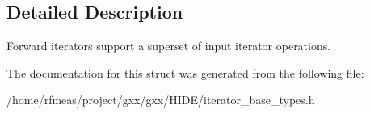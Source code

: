 \subsection{Detailed Description}
Forward iterators support a superset of input iterator operations. 

The documentation for this struct was generated from the following file\+:\begin{DoxyCompactItemize}
\item 
/home/rfmeas/project/gxx/gxx/\+H\+I\+D\+E/iterator\+\_\+base\+\_\+types.\+h\end{DoxyCompactItemize}
